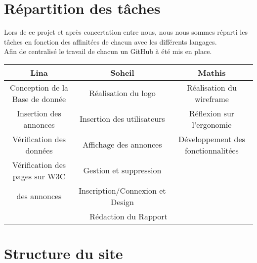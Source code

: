 \documentclass[11pt,a4paper]{article}
\begin{document}
\section{Répartition des tâches}
Lors de ce projet et après concertation entre nous, nous nous sommes réparti les tâches en fonction des affinitées de chacun avec les différents langages.\\
Afin de centralisé le travail de chacun un GitHub à été mis en place.
\begin{center}
    \begin{tabular}{|c|c|c|}
      \hline
      Lina & Soheil & Mathis \\ \hline
      Conception de la Base de donnée & Réalisation du logo & Réalisation du wireframe \\
      Insertion des annonces & Insertion des utilisateurs & Réflexion sur l'ergonomie \\
      Vérification des données & Affichage des annonces & Développement des fonctionnalitées \\
      Vérification des pages sur W3C & Gestion et suppression\\ des annonces & Inscription/Connexion et Design \\
      \hline
      \multicolumn{3}{|c|}{Rédaction du Rapport} \\
      \hline
    \end{tabular}
  \end{center}


\section{Structure du site}
\end{document}
